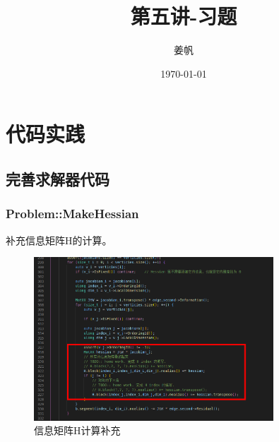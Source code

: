 \documentclass[UTF8]{ctexart}
\title{第五讲-习题}
\author{姜帆}
\date{\today}
\begin{document}
\maketitle
\tableofcontents
\newpage
\section{代码实践}
\subsection{完善求解器代码}
\subsubsection{Problem::MakeHessian}
\indent 补充信息矩阵H的计算。\\
\begin{figure}[H]
\centering
\includegraphics[width=0.8\textwidth]{1.1.1.jpg}    
\caption{信息矩阵H计算补充}
\label{img0}
\end{figure}
\end{document}
